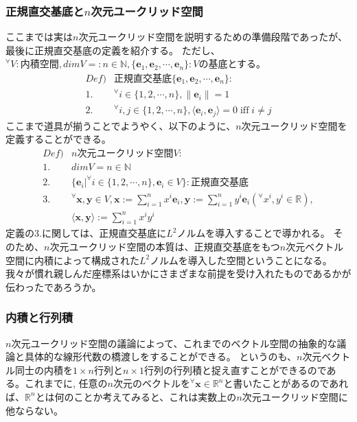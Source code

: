 \documentclass[10pt]{ujarticle}
\begin{document}
\subsubsection{正規直交基底と$n$次元ユークリッド空間}
ここまでは実は$n$次元ユークリッド空間を説明するための準備段階であったが、最後に正規直交基底の定義を紹介する。
ただし、$^\forall V:\text{内積空間},dimV=:n\in\mathbb{N},\{\mathbf{e}_1,\mathbf{e}_2,\cdots,\mathbf{e}_n\}:V\text{の基底}$とする。
$$
\begin{aligned}
  Def)&\text{正規直交基底}\{\mathbf{e}_1,\mathbf{e}_2,\cdots,\mathbf{e}_n\}:\\
  1.&^\forall i\in\{1,2,\cdots,n\},\|\mathbf{e}_i\|=1\\
  2.&^\forall i,j\in\{1,2,\cdots,n\},\langle\mathbf{e}_i,\mathbf{e}_j\rangle=0\;\text{iff}\;i\neq j
\end{aligned}
$$
ここまで道具が揃うことでようやく、以下のように、$n$次元ユークリッド空間を定義することができる。
$$
\begin{aligned}
  Def)&n\text{次元ユークリッド空間}V:\\
  1.&dimV=n\in\mathbb{N}\\
  2.&\{\mathbf{e}_i|^\forall i\in\{1,2,\cdots,n\},\mathbf{e}_i\in V\}:\text{正規直交基底}\\
  3.&^\forall\mathbf{x},\mathbf{y}\in V, \mathbf{x}:=\sum_{i=1}^nx^i\mathbf{e}_i,\mathbf{y}:=\sum_{i=1}^ny^i\mathbf{e}_i(^\forall x^i,y^i\in\mathbb{R}),\\
  &\langle\mathbf{x},\mathbf{y}\rangle:=\sum_{i=1}^nx^iy^i
\end{aligned}
$$
定義の3.に関しては、正規直交基底に$L^2$ノルムを導入することで導かれる。
そのため、$n$次元ユークリッド空間の本質は、正規直交基底をもつ$n$次元ベクトル空間に内積によって構成された$L^2$ノルムを導入した空間ということになる。
我々が慣れ親しんだ座標系はいかにさまざまな前提を受け入れたものであるかが伝わったであろうか。

\subsubsection{内積と行列積}
$n$次元ユークリッド空間の議論によって、これまでのベクトル空間の抽象的な議論と具体的な線形代数の橋渡しをすることができる。
というのも、$n$次元ベクトル同士の内積を$1\times n$行列と$n\times 1$行列の行列積と捉え直すことができるのである。これまでに,
任意の$n$次元のベクトルを$^\forall\mathbf{x}\in\mathbb{R}^n$と書いたことがあるのであれば、$\mathbb{R}^n$とは何のことか考えてみると、これは実数上の$n$次元ユークリッド空間に他ならない。
\end{document}
